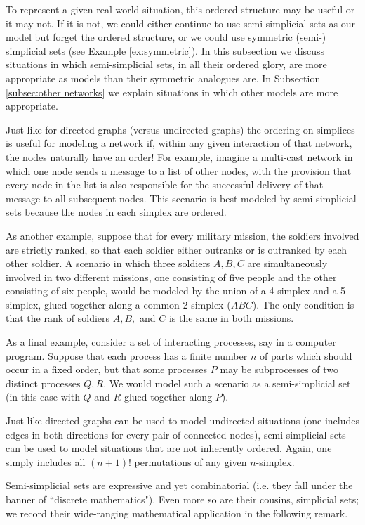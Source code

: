 \documentclass{amsart}
\begin{document}
To represent a given real-world situation, this ordered structure may be useful or it may not.  If it is not, we could either continue to use semi-simplicial sets as our model but forget the ordered structure, or we could use symmetric (semi-) simplicial sets (see Example \ref{ex:symmetric}).  In this subsection we discuss situations in which semi-simplicial sets, in all their ordered glory, are more appropriate as models than their symmetric analogues are.  In Subsection \ref{subsec:other networks} we explain situations in which other models are more appropriate.

Just like for directed graphs (versus undirected graphs) the ordering on simplices is useful for modeling a network if, within any given interaction of that network, the nodes naturally have an order!  For example, imagine a multi-cast network in which one node sends a message to a list of other nodes, with the provision that every node in the list is also responsible for the successful delivery of that message to all subsequent nodes.  This scenario is best modeled by semi-simplicial sets because the nodes in each simplex are ordered.

As another example, suppose that for every military mission, the soldiers involved are strictly ranked, so that each soldier either outranks or is outranked by each other soldier.  A scenario in which three soldiers $A,B,C$ are simultaneously involved in two different missions, one consisting of five people and the other consisting of six people, would be modeled by the union of a 4-simplex and a 5-simplex, glued together along a common 2-simplex ($ABC$).  The only condition is that the rank of soldiers $A,B,$ and $C$ is the same in both missions.

As a final example, consider a set of interacting processes, say in a computer program.  Suppose that each process has a finite number $n$ of parts which should occur in a fixed order, but that some processes $P$ may be subprocesses of two distinct processes $Q,R$.  We would model such a scenario as a semi-simplicial set (in this case with $Q$ and $R$ glued together along $P$).

Just like directed graphs can be used to model undirected situations (one includes edges in both directions for every pair of connected nodes), semi-simplicial sets can be used to model situations that are not inherently ordered.  Again, one simply includes all $(n+1)!$ permutations of any given $n$-simplex. 

Semi-simplicial sets are expressive and yet combinatorial (i.e. they fall under the banner of ``discrete mathematics").  Even more so are their cousins, simplicial sets; we record their wide-ranging mathematical application in the following remark.
\end{document}
